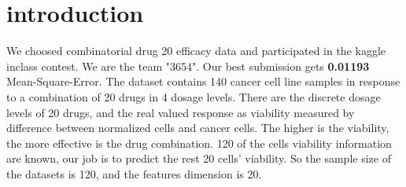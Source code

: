 \section{introduction}
We choosed combinatorial drug 20 efficacy data and participated in the kaggle inclass contest.  We are the team "3654". Our best submission gets \textbf{0.01193} Mean-Square-Error. 
The dataset contains 140 cancer cell line samples in response to a combination of 20 drugs in 4 dosage levels. There are the discrete dosage levels of 20 drugs, and the real valued response as viability measured by difference between normalized cells and cancer cells. The higher is the viability, the more effective is the drug combination. 120 of the cells viability information are known, our job is to predict the rest 20 cells' viability.
So the sample size of the datasets is 120, and the features dimension is 20. 